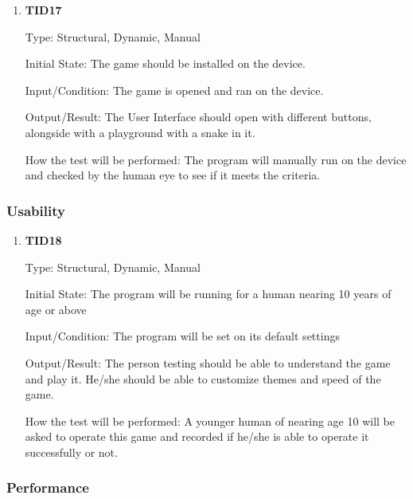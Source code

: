 \documentclass[12pt, titlepage]{article}
\begin{document}
\begin{enumerate}
	
	\item{\textbf{TID17}\\}
	
	Type: Structural, Dynamic, Manual
	
	Initial State: The game should be installed on the device.
	
	Input/Condition: The game is opened and ran on the device.
	
	Output/Result: The User Interface should open with different buttons, alongside with a playground with a snake in it.
	
	How the test will be performed: The program will manually run on the device and checked by the human eye to see if it meets the criteria. 
	
	
\end{enumerate}

\subsubsection{Usability}

\begin{enumerate}
	
	\item{\textbf{TID18}\\}
	
	Type: Structural, Dynamic, Manual
	
	Initial State: The program will be running for a human nearing 10 years of age or above
	
	Input/Condition: The program will be set on its default settings
	
	Output/Result: The person testing should be able to understand the game and play it. He/she should be able to customize themes and speed of the game.
	
	How the test will be performed: A younger human of nearing age 10 will be asked to operate this game and recorded if he/she is able to operate it successfully or not. 
	
	
\end{enumerate}

\subsubsection{Performance}
\end{document}
